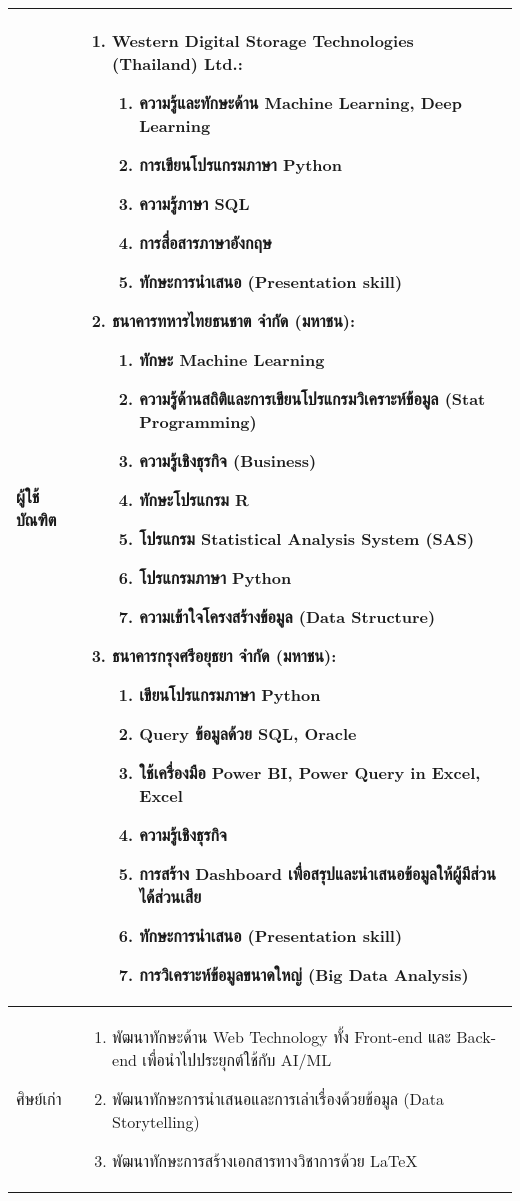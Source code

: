 \begin{longtable}{|p{} | p{}|}
ผู้ใช้บัณฑิต & 
\begin{enumerate}
  \item \textbf{Western Digital Storage Technologies (Thailand) Ltd.:} 
    \begin{enumerate}
      \item ความรู้และทักษะด้าน Machine Learning, Deep Learning
      \item การเขียนโปรแกรมภาษา Python
      \item ความรู้ภาษา SQL
      \item การสื่อสารภาษาอังกฤษ
      \item ทักษะการนำเสนอ (Presentation skill)
    \end{enumerate}
  \item \textbf{ธนาคารทหารไทยธนชาต จำกัด (มหาชน):}
    \begin{enumerate}
      \item ทักษะ Machine Learning
      \item ความรู้ด้านสถิติและการเขียนโปรแกรมวิเคราะห์ข้อมูล (Stat Programming)
      \item ความรู้เชิงธุรกิจ (Business)
      \item ทักษะโปรแกรม R
      \item โปรแกรม Statistical Analysis System (SAS)
      \item โปรแกรมภาษา Python
      \item ความเข้าใจโครงสร้างข้อมูล (Data Structure)
    \end{enumerate}
  \item \textbf{ธนาคารกรุงศรีอยุธยา จำกัด (มหาชน):}
    \begin{enumerate}
      \item เขียนโปรแกรมภาษา Python
      \item Query ข้อมูลด้วย SQL, Oracle
      \item ใช้เครื่องมือ Power BI, Power Query in Excel, Excel
      \item ความรู้เชิงธุรกิจ
      \item การสร้าง Dashboard เพื่อสรุปและนำเสนอข้อมูลให้ผู้มีส่วนได้ส่วนเสีย
      \item ทักษะการนำเสนอ (Presentation skill)
      \item การวิเคราะห์ข้อมูลขนาดใหญ่ (Big Data Analysis)
    \end{enumerate}
\end{enumerate} \\ \hline

ศิษย์เก่า & 
\begin{enumerate}
  \item พัฒนาทักษะด้าน Web Technology ทั้ง Front-end และ Back-end เพื่อนำไปประยุกต์ใช้กับ AI/ML
  \item พัฒนาทักษะการนำเสนอและการเล่าเรื่องด้วยข้อมูล (Data Storytelling)
  \item พัฒนาทักษะการสร้างเอกสารทางวิชาการด้วย LaTeX
\end{enumerate} \\ \hline


\end{longtable}
